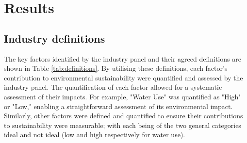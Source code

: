\section{Results}

\subsection{Industry definitions}

The key factors identified by the industry panel and their agreed definitions are shown in Table \ref{tab:definitions}. By utilising these definitions, each factor's contribution to environmental sustainability were quantified and assessed by the industry panel. The quantification of each factor allowed for a systematic assessment of their impacts. For example, "Water Use" was quantified as "High" or "Low," enabling a straightforward assessment of its environmental impact. Similarly, other factors were defined and quantified to ensure their contributions to sustainability were measurable; with each being of the two general categories ideal and not ideal (low and high respectively for water use).

% 
% 

